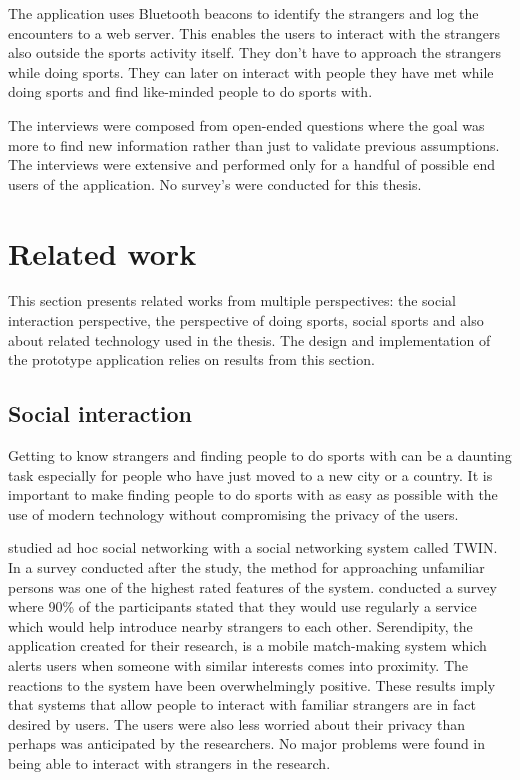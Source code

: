 The application uses Bluetooth beacons to identify the strangers and log the encounters to a web server. This enables the users to interact with the strangers also outside the sports activity itself. They don't have to approach the strangers while doing sports. They can later on interact with people they have met while doing sports and find like-minded people to do sports with. 

The interviews were composed from open-ended questions where the goal was more to find new information rather than just to validate previous assumptions. The interviews were extensive and performed only for a handful of possible end users of the application. No survey's were conducted for this thesis.

\section{Related work}

This section presents related works from multiple perspectives: the social interaction perspective, the perspective of doing sports, social sports and also about related technology used in the thesis. The design and implementation of the prototype application relies on results from this section.

\subsection{Social interaction}

Getting to know strangers and finding people to do sports with can be a daunting task especially for people who have just moved to a new city or a country. It is important to make finding people to do sports with as easy as possible with the use of modern technology without compromising the privacy of the users.

\cite{socialAdHoc} studied ad hoc social networking with a social networking system called TWIN. In a survey conducted after the study, the method for approaching unfamiliar persons was one of the highest rated features of the system. \cite{mobileMatchmaking} conducted a survey where 90\% of the participants stated that they would use regularly a service which would help introduce nearby strangers to each other. Serendipity, the application created for their research, is a mobile match-making system which alerts users when someone with similar interests comes into proximity. The reactions to the system have been overwhelmingly positive. These results imply that systems that allow people to interact with familiar strangers are in fact desired by users. The users were also less worried about their privacy than perhaps was anticipated by the researchers. No major problems were found in being able to interact with strangers in the research.


